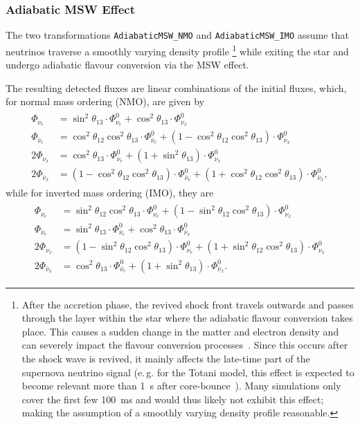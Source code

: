 \documentclass[11pt, oneside]{article}
\newcommand{\nue}{\ensuremath{\nu_e}\xspace}
\newcommand{\nux}{\ensuremath{\nu_x}\xspace}
\newcommand{\nuebar}{\ensuremath{\bar{\nu}_e}\xspace}
\newcommand{\nuxbar}{\ensuremath{\bar{\nu}_x}\xspace}
\begin{document}
\subsubsection{Adiabatic MSW Effect}
The two transformations \texttt{AdiabaticMSW\_NMO} and \texttt{AdiabaticMSW\_IMO} assume that neutrinos traverse a smoothly varying density profile%
\footnote{After the accretion phase, the revived shock front travels outwards and passes through the layer within the star where the adiabatic flavour conversion takes place.
This causes a sudden change in the matter and electron density and can severely impact the flavour conversion processes~\cite{Schirato2002}.
Since this occurs after the shock wave is revived, it mainly affects the late-time part of the supernova neutrino signal (e.\,g. for the Totani model, this effect is expected to become relevant more than \SI{1}{s} after core-bounce~\cite{Fogli2005}). Many simulations only cover the first few \SI{100}{ms} and would thus likely not exhibit this effect; making the assumption of a smoothly varying density profile reasonable.}
while exiting the star and undergo adiabatic flavour conversion via the MSW effect.


The resulting detected fluxes are linear combinations of the initial fluxes, which, for normal mass ordering (NMO), are given by~\cite{Dighe2000}
\begin{align}
\begin{split}
\Phi_{\nue} &= \sin^2 \theta_{13} \cdot \Phi_{\nue}^0 + \cos^2 \theta_{13} \cdot \Phi_{\nux}^0\\
\Phi_{\nuebar} &= \cos^2 \theta_{12} \cos^2 \theta_{13} \cdot \Phi^0_{\nuebar} + (1 - \cos^2 \theta_{12} \cos^2 \theta_{13}) \cdot \Phi^0_{\nuxbar} \\
2 \Phi_{\nux} &= \cos^2 \theta_{13} \cdot \Phi^0_{\nue} + (1 + \sin^2 \theta_{13}) \cdot \Phi^0_{\nux} \\
2 \Phi_{\nuxbar} &= (1 - \cos^2 \theta_{12} \cos^2 \theta_{13}) \cdot \Phi^0_{\nuebar} + (1 + \cos^2 \theta_{12} \cos^2 \theta_{13}) \cdot \Phi^0_{\nuxbar},
\end{split}
\end{align}
while for inverted mass ordering (IMO), they are
\begin{align}
\begin{split}
\Phi_{\nue} &= \sin^2 \theta_{12} \cos^2 \theta_{13} \cdot \Phi_{\nue}^0 + (1 - \sin^2 \theta_{12} \cos^2 \theta_{13}) \cdot \Phi_{\nux}^0\\
\Phi_{\nuebar} &= \sin^2 \theta_{13} \cdot \Phi_{\nuebar}^0 + \cos^2 \theta_{13} \cdot \Phi_{\nuxbar}^0\\
2 \Phi_{\nux} &= (1 - \sin^2 \theta_{12} \cos^2 \theta_{13}) \cdot \Phi_{\nue}^0 + (1 + \sin^2 \theta_{12} \cos^2 \theta_{13}) \cdot \Phi_{\nux}^0\\
2 \Phi_{\nuxbar} &= \cos^2 \theta_{13} \cdot \Phi_{\nuebar}^0 + (1 + \sin^2 \theta_{13}) \cdot \Phi^0_{\nuxbar}.
\end{split}
\end{align}
\end{document}
